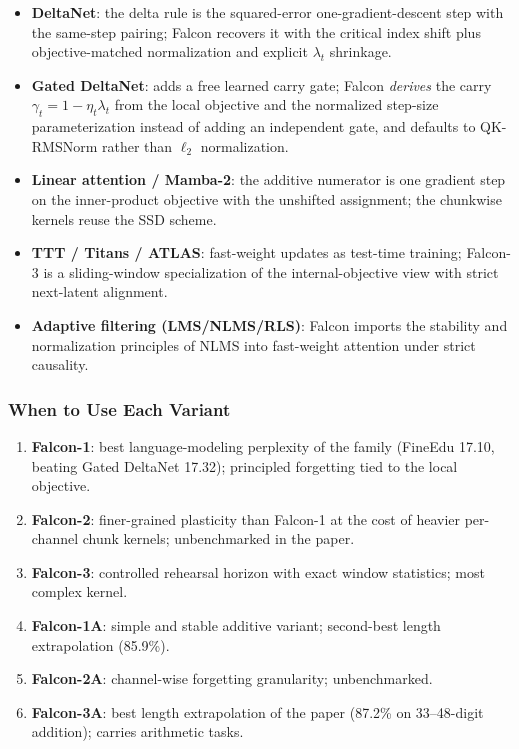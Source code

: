 \begin{itemize}[leftmargin=*]
    \item \textbf{DeltaNet}: the delta rule is the squared-error one-gradient-descent step with the same-step pairing; Falcon recovers it with the critical index shift plus objective-matched normalization and explicit $\lambda_t$ shrinkage.
    \item \textbf{Gated DeltaNet}: adds a free learned carry gate; Falcon \emph{derives} the carry $\gamma_t = 1 - \eta_t \lambda_t$ from the local objective and the normalized step-size parameterization instead of adding an independent gate, and defaults to QK-RMSNorm rather than $\ell_2$ normalization.
    \item \textbf{Linear attention / Mamba-2}: the additive numerator is one gradient step on the inner-product objective with the unshifted assignment; the chunkwise kernels reuse the SSD scheme.
    \item \textbf{TTT / Titans / ATLAS}: fast-weight updates as test-time training; Falcon-3 is a sliding-window specialization of the internal-objective view with strict next-latent alignment.
    \item \textbf{Adaptive filtering (LMS/NLMS/RLS)}: Falcon imports the stability and normalization principles of NLMS into fast-weight attention under strict causality.
\end{itemize}

\subsubsection{When to Use Each Variant}

\begin{enumerate}[leftmargin=*]
    \item \textbf{Falcon-1}: best language-modeling perplexity of the family (FineEdu 17.10, beating Gated DeltaNet 17.32); principled forgetting tied to the local objective.
    \item \textbf{Falcon-2}: finer-grained plasticity than Falcon-1 at the cost of heavier per-channel chunk kernels; unbenchmarked in the paper.
    \item \textbf{Falcon-3}: controlled rehearsal horizon with exact window statistics; most complex kernel.
    \item \textbf{Falcon-1A}: simple and stable additive variant; second-best length extrapolation (85.9\%).
    \item \textbf{Falcon-2A}: channel-wise forgetting granularity; unbenchmarked.
    \item \textbf{Falcon-3A}: best length extrapolation of the paper (87.2\% on 33--48-digit addition); carries arithmetic tasks.
\end{enumerate}